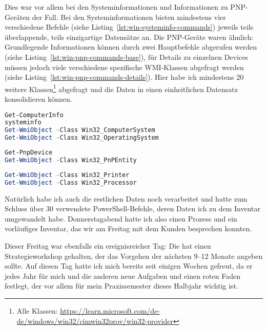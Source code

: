 Dies war vor allem bei den Systeminformationen und Informationen zu PNP-Geräten der Fall.
Bei den Systeminformationen bieten mindestens vier verschiedene Befehle (siehe Listing\ \ref{lst:win-systeminfo-commands}) jeweils teils überlappende, teils einzigartige Datensätze an.
Die PNP-Geräte waren ähnlich:
Grundlegende Informationen können durch zwei Hauptbefehle abgerufen werden (siehe Listing\ \ref{lst:win-pnp-commands-base}), für Details zu einzelnen Devices müssen jedoch viele verschiedene spezifische WMI-Klassen abgefragt werden (siehe Listing\ \ref{lst:win-pnp-commands-details}).
Hier habe ich mindestens 20 weitere Klassen\footnote{Alle Klassen: \url{https://learn.microsoft.com/de-de/windows/win32/cimwin32prov/win32-provider}} abgefragt und die Daten in einen einheitlichen Datensatz konsolidieren können.

\begin{lstlisting}[language=PowerShell, label={lst:win-systeminfo-commands}, caption={Windows Systeminformationen abfragen}]
Get-ComputerInfo
systeminfo
Get-WmiObject -Class Win32_ComputerSystem
Get-WmiObject -Class Win32_OperatingSystem
\end{lstlisting}

\begin{lstlisting}[language=PowerShell, label={lst:win-pnp-commands-base}, caption={Windows PNP-Devices abfragen}]
Get-PnpDevice
Get-WmiObject -Class Win32_PnPEntity
\end{lstlisting}

\begin{lstlisting}[language=PowerShell, label={lst:win-pnp-commands-details}, caption={Details zu Windows PNP-Devices abfragen}]
Get-WmiObject -Class Win32_Printer
Get-WmiObject -Class Win32_Processor
\end{lstlisting}

Natürlich habe ich auch die restlichen Daten noch verarbeitet und hatte zum Schluss über 30 verwendete PowerShell-Befehle, deren Daten ich zu dem Inventar umgewandelt habe.
Donnerstagabend hatte ich also einen Prozess und ein vorläufiges Inventar, das wir am Freitag mit dem Kunden besprechen konnten.

Dieser Freitag war ebenfalls ein ereignisreicher Tag:
Die {\metaeffekt} hat einen Strategieworkshop gehalten, der das Vorgehen der nächsten 9--12 Monate angeben sollte.
Auf diesen Tag hatte ich mich bereits seit einigen Wochen gefreut, da er jedes Jahr für mich und die anderen neue Aufgaben und einen roten Faden festlegt, der vor allem für mein Praxissemester dieses Halbjahr wichtig ist.


